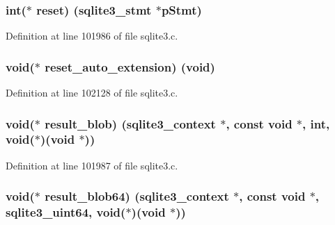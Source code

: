 \subsubsection[{reset}]{\setlength{\rightskip}{0pt plus 5cm}int($\ast$ reset) ({\bf sqlite3\+\_\+stmt} $\ast$p\+Stmt)}\label{structsqlite3__api__routines_a9306f6bfcddcbc6d67a69c8139e6cef6}


Definition at line 101986 of file sqlite3.\+c.

\hypertarget{structsqlite3__api__routines_aef8ba7d5f8d6ce8841b86ce43abf48d8}{}
\subsubsection[{reset\+\_\+auto\+\_\+extension}]{\setlength{\rightskip}{0pt plus 5cm}void($\ast$ reset\+\_\+auto\+\_\+extension) (void)}\label{structsqlite3__api__routines_aef8ba7d5f8d6ce8841b86ce43abf48d8}


Definition at line 102128 of file sqlite3.\+c.

\hypertarget{structsqlite3__api__routines_a74bf6ce8a7217120babcb02333696681}{}
\subsubsection[{result\+\_\+blob}]{\setlength{\rightskip}{0pt plus 5cm}void($\ast$ result\+\_\+blob) ({\bf sqlite3\+\_\+context} $\ast$, const void $\ast$, int, void($\ast$)(void $\ast$))}\label{structsqlite3__api__routines_a74bf6ce8a7217120babcb02333696681}


Definition at line 101987 of file sqlite3.\+c.

\hypertarget{structsqlite3__api__routines_a240a03a7ab8b6e0b1e124fa9132ba721}{}
\subsubsection[{result\+\_\+blob64}]{\setlength{\rightskip}{0pt plus 5cm}void($\ast$ result\+\_\+blob64) ({\bf sqlite3\+\_\+context} $\ast$, const void $\ast$, {\bf sqlite3\+\_\+uint64}, void($\ast$)(void $\ast$))}\label{structsqlite3__api__routines_a240a03a7ab8b6e0b1e124fa9132ba721}



